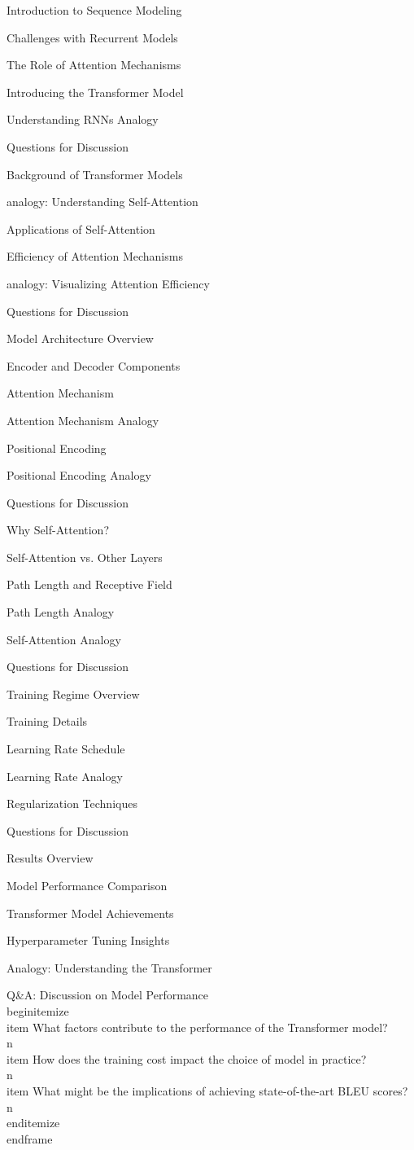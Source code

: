 \documentclass{beamer}
\begin{document}
\begin{frame}[]{Introduction to Sequence Modeling}
\begin{frame}[]{Challenges with Recurrent Models}
\begin{frame}[]{The Role of Attention Mechanisms}
\begin{frame}[]{Introducing the Transformer Model}
\begin{frame}[plain]{Understanding RNNs Analogy}
\begin{frame}[]{Questions for Discussion}
\begin{frame}[]{Background of Transformer Models}
\begin{frame}[plain]{analogy: Understanding Self-Attention}
\begin{frame}[]{Applications of Self-Attention}
\begin{frame}[]{Efficiency of Attention Mechanisms}
\begin{frame}[plain]{analogy: Visualizing Attention Efficiency}
\begin{frame}[]{Questions for Discussion}
\begin{frame}[]{Model Architecture Overview}
\begin{frame}[]{Encoder and Decoder Components}
\begin{frame}[]{Attention Mechanism}
\begin{frame}[plain]{Attention Mechanism Analogy}
\begin{frame}[]{Positional Encoding}
\begin{frame}[plain]{Positional Encoding Analogy}
\begin{frame}[]{Questions for Discussion}
\begin{frame}[]{Why Self-Attention?}
\begin{frame}[]{Self-Attention vs. Other Layers}
\begin{frame}[]{Path Length and Receptive Field}
\begin{frame}[plain]{Path Length Analogy}
\begin{frame}[plain]{Self-Attention Analogy}
\begin{frame}[]{Questions for Discussion}
\begin{frame}[]{Training Regime Overview}
\begin{frame}[]{Training Details}
\begin{frame}[]{Learning Rate Schedule}
\begin{frame}[plain]{Learning Rate Analogy}
\begin{frame}[]{Regularization Techniques}
\begin{frame}[]{Questions for Discussion}
\begin{frame}[]{Results Overview}
\begin{frame}[]{Model Performance Comparison}
\begin{frame}[]{Transformer Model Achievements}
\begin{frame}[]{Hyperparameter Tuning Insights}
\begin{frame}[plain]{Analogy: Understanding the Transformer}
\begingroup
{}\n{}\n\begin{frame}[]{Q\&A: Discussion on Model Performance}\n\\begin{itemize}
\\item What factors contribute to the performance of the Transformer model?\\n\\item How does the training cost impact the choice of model in practice?\\n\\item What might be the implications of achieving state-of-the-art BLEU scores?\\n\\end{itemize}
\\end{frame}

\endgroup


\end{frame}
\end{frame}
\end{frame}
\end{frame}
\end{frame}
\end{frame}
\end{frame}
\end{frame}
\end{frame}
\end{frame}
\end{frame}
\end{frame}
\end{frame}
\end{frame}
\end{frame}
\end{frame}
\end{frame}
\end{frame}
\end{frame}
\end{frame}
\end{frame}
\end{frame}
\end{frame}
\end{frame}
\end{frame}
\end{frame}
\end{frame}
\end{frame}
\end{frame}
\end{frame}
\end{frame}
\end{frame}
\end{frame}
\end{frame}
\end{frame}
\end{frame}
\end{frame}
\end{document}
